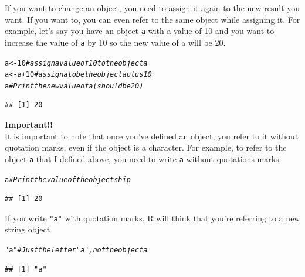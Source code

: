 \documentclass{tufte-book}\usepackage[]{graphicx}\usepackage[]{color}
\makeatletter
\newcommand{\hlnum}[1]{\textcolor[rgb]{0.686,0.059,0.569}{#1}}%
\newcommand{\hlstr}[1]{\textcolor[rgb]{0.192,0.494,0.8}{#1}}%
\newcommand{\hlcom}[1]{\textcolor[rgb]{0.678,0.584,0.686}{\textit{#1}}}%
\newcommand{\hlopt}[1]{\textcolor[rgb]{0,0,0}{#1}}%
\newcommand{\hlstd}[1]{\textcolor[rgb]{0.345,0.345,0.345}{#1}}%
\newcommand{\hlkwb}[1]{\textcolor[rgb]{0.69,0.353,0.396}{#1}}%
\newenvironment{kframe}{%
 \def\at@end@of@kframe{}%
 \ifinner\ifhmode%
  \def\at@end@of@kframe{\end{minipage}}%
  \begin{minipage}{\columnwidth}%
 \fi\fi%
 \def\FrameCommand##1{\hskip\@totalleftmargin \hskip-\fboxsep
 \colorbox{shadecolor}{##1}\hskip-\fboxsep
     \hskip-\linewidth \hskip-\@totalleftmargin \hskip\columnwidth}%
 \MakeFramed {\advance\hsize-\width
   \@totalleftmargin\z@ \linewidth\hsize
   \@setminipage}}%
 {\par\unskip\endMakeFramed%
 \at@end@of@kframe}
\newenvironment{knitrout}{}{} %
\makeatother
\begin{document}
If you want to change an object, you need to assign it again to the new result you want. If you want to, you can even refer to the same object while assigning it. For example, let's say you have an object \texttt{a} with a value of 10 and you want to increase the value of \texttt{a} by 10 so the new value of a will be 20.

\begin{knitrout}
\color{fgcolor}\begin{kframe}
\begin{alltt}
\hlstd{a} \hlkwb{<-} \hlnum{10}   \hlcom{# assign a value of 10 to the object a}
\hlstd{a} \hlkwb{<-} \hlstd{a} \hlopt{+} \hlnum{10}  \hlcom{# assign a to be the object a plus 10}
\hlstd{a} \hlcom{# Print the new value of a (should be 20)}
\end{alltt}
\begin{verbatim}
## [1] 20
\end{verbatim}
\end{kframe}
\end{knitrout}




\textbf{Important!!} \\

It is important to note that once you've defined an object, you refer to it without quotation marks, even if the object is a character. For example, to refer to the object \texttt{a} that I defined above, you need to write \texttt{a} without quotations marks

\begin{knitrout}
\color{fgcolor}\begin{kframe}
\begin{alltt}
\hlstd{a} \hlcom{# Print the value of the object ship}
\end{alltt}
\begin{verbatim}
## [1] 20
\end{verbatim}
\end{kframe}
\end{knitrout}

If you write \texttt{"a"} with quotation marks, R will think that you're referring to a new string object

\begin{knitrout}
\color{fgcolor}\begin{kframe}
\begin{alltt}
\hlstr{"a"}   \hlcom{# Just the letter "a", not the object a}
\end{alltt}
\begin{verbatim}
## [1] "a"
\end{verbatim}
\end{kframe}
\end{knitrout}
\end{document}

